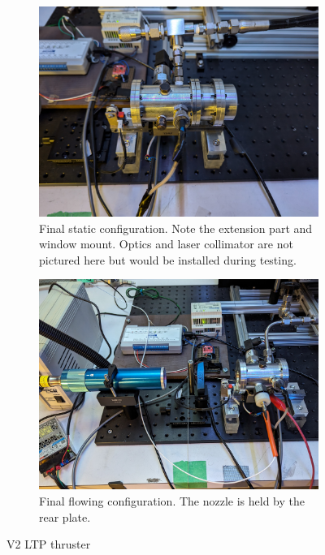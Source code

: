             \begin{figure}[!ht]
                \centering
                \begin{subfigure}[t]{0.45\textwidth}
                    \centering
                    \includegraphics[width=\textwidth]{assets/3 design/V2 Static configuration.jpg}
                    \caption{Final static configuration. Note the extension part and window mount. Optics and laser collimator are not pictured here but would be installed during testing.}
                \end{subfigure}
                \hfill
                \begin{subfigure}[t]{0.45\textwidth}
                    \centering
                    \includegraphics[width=\textwidth]{assets/3 design/V2 flowing setup.jpg}
                    \caption{Final flowing configuration. The nozzle is held by the rear plate.}
                \end{subfigure}
                \caption{V2 LTP thruster}
                \label{fig:V2 IRL setup}
            \end{figure}

